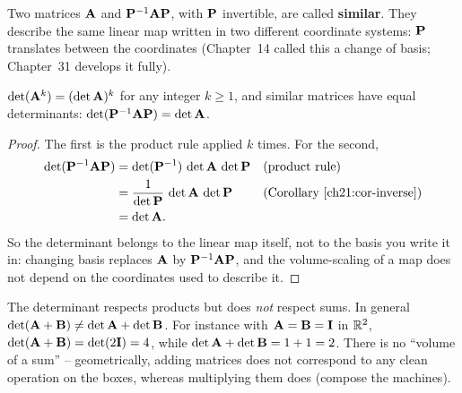 Two matrices $\mathbf{A}$ and $\mathbf{P}^{-1}\mathbf{A}\mathbf{P}$, with $\mathbf{P}$ invertible,
are called \textbf{similar}. They describe the same linear map written in two
different coordinate systems: $\mathbf{P}$ translates between the coordinates
(Chapter~14 called this a change of basis; Chapter~31 develops it fully).

\begin{corollary}
\label{ch21:cor-powers}
$\det(\mathbf{A}^k) = (\det\mathbf{A})^k$ for any integer $k\ge 1$, and similar matrices
have equal determinants: $\det(\mathbf{P}^{-1}\mathbf{A}\mathbf{P}) = \det\mathbf{A}$.
\end{corollary}

\begin{proof}
The first is the product rule applied $k$ times. For the second,
\begin{align*}
  \det(\mathbf{P}^{-1}\mathbf{A}\mathbf{P})
  &= \det(\mathbf{P}^{-1})\,\det\mathbf{A}\,\det\mathbf{P} && \text{(product rule)}\\
  &= \frac{1}{\det\mathbf{P}}\,\det\mathbf{A}\,\det\mathbf{P} && \text{(Corollary~\ref{ch21:cor-inverse})}\\
  &= \det\mathbf{A}.
\end{align*}
So the determinant belongs to the linear map itself, not to the
basis you write it in: changing basis replaces $\mathbf{A}$ by $\mathbf{P}^{-1}\mathbf{A}\mathbf{P}$, and the
volume-scaling of a map does not depend on the coordinates used to describe it.
\end{proof}

\begin{remark}
\label{ch21:remark-sum}
The determinant respects products but does \emph{not} respect sums. In general
$\det(\mathbf{A}+\mathbf{B}) \neq \det\mathbf{A} + \det\mathbf{B}$. For instance with
$\mathbf{A} = \mathbf{B} = \mathbf{I}$ in $\mathbb{R}^2$, $\det(\mathbf{A}+\mathbf{B}) = \det(2\mathbf{I})
= 4$, while $\det\mathbf{A} + \det\mathbf{B} = 1 + 1 = 2$. There is no ``volume of a
sum'' -- geometrically, adding matrices does not correspond to any clean operation
on the boxes, whereas multiplying them does (compose the machines).
\end{remark}


